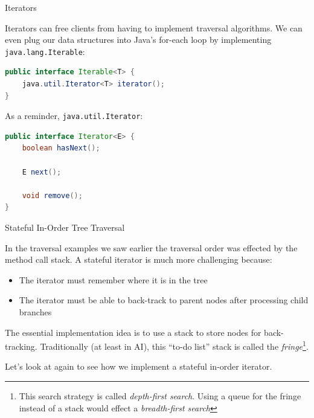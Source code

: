 \documentclass{beamer}
\begin{document}
\begin{frame}[fragile]{Iterators}


Iterators can free clients from having to implement traversal algorithms.  We can even plug our data structures into Java's for-each loop by implementing {\tt java.lang.Iterable}:
\begin{lstlisting}[language=Java]
public interface Iterable<T> {
    java.util.Iterator<T> iterator();
}
\end{lstlisting}
As a reminder, {\tt java.util.Iterator}:
\begin{lstlisting}[language=Java]
public interface Iterator<E> {
    boolean hasNext();

    E next();

    void remove();
}
\end{lstlisting}

\end{frame}

\begin{frame}[fragile]{Stateful In-Order Tree Traversal}


In the traversal examples we saw earlier the traversal order was effected by the method call stack.  A stateful iterator is much more challenging because:

\begin{itemize}
\item The iterator must remember where it is in the tree
\item The iterator must be able to back-track to parent nodes after processing child branches
\end{itemize}

The essential implementation idea is to use a stack to store nodes for back-tracking.  Traditionally (at least in AI), this ``to-do list'' stack is called the {\it fringe}\footnote{This search strategy is called {\it depth-first search}.  Using a queue for the fringe instead of a stack would effect a {\it breadth-first search}}.

Let's look at  again to see how we implement a stateful in-order iterator.

\end{frame}
\end{document}
